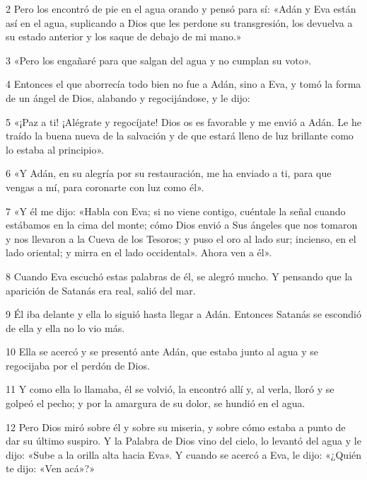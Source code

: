 \par 2 Pero los encontró de pie en el agua orando y pensó para sí: «Adán y Eva están así en el agua, suplicando a Dios que les perdone su transgresión, los devuelva a su estado anterior y los saque de debajo de mi mano.»

\par 3 «Pero los engañaré para que salgan del agua y no cumplan su voto».

\par 4 Entonces el que aborrecía todo bien no fue a Adán, sino a Eva, y tomó la forma de un ángel de Dios, alabando y regocijándose, y le dijo:

\par 5 «¡Paz a ti! ¡Alégrate y regocíjate! Dios os es favorable y me envió a Adán. Le he traído la buena nueva de la salvación y de que estará lleno de luz brillante como lo estaba al principio».

\par 6 «Y Adán, en su alegría por su restauración, me ha enviado a ti, para que vengas a mí, para coronarte con luz como él».

\par 7 «Y él me dijo: «Habla con Eva; si no viene contigo, cuéntale la señal cuando estábamos en la cima del monte; cómo Dios envió a Sus ángeles que nos tomaron y nos llevaron a la Cueva de los Tesoros; y puso el oro al lado sur; incienso, en el lado oriental; y mirra en el lado occidental». Ahora ven a él».

\par 8 Cuando Eva escuchó estas palabras de él, se alegró mucho. Y pensando que la aparición de Satanás era real, salió del mar.

\par 9 Él iba delante y ella lo siguió hasta llegar a Adán. Entonces Satanás se escondió de ella y ella no lo vio más.

\par 10 Ella se acercó y se presentó ante Adán, que estaba junto al agua y se regocijaba por el perdón de Dios.

\par 11 Y como ella lo llamaba, él se volvió, la encontró allí y, al verla, lloró y se golpeó el pecho; y por la amargura de su dolor, se hundió en el agua.

\par 12 Pero Dios miró sobre él y sobre su miseria, y sobre cómo estaba a punto de dar su último suspiro. Y la Palabra de Dios vino del cielo, lo levantó del agua y le dijo: «Sube a la orilla alta hacia Eva». Y cuando se acercó a Eva, le dijo: «¿Quién te dijo: «Ven acá»?»

